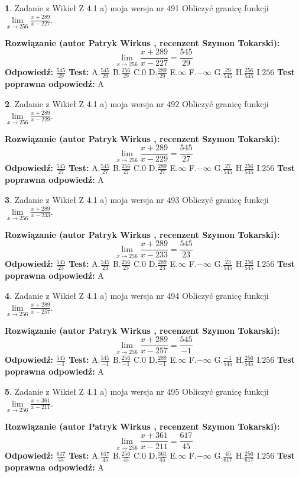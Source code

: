 \documentclass[12pt, a4paper]{article}
\theoremstyle{definition} %
\newtheorem{zad}{}
\newcommand{\zadStart}[1]{\begin{zad}#1\newline}
\newcommand{\zadStop}{\end{zad}}
\newcommand{\rozwStart}[2]{\noindent \textbf{Rozwiązanie (autor #1 , recenzent #2): }\newline}
\newcommand{\rozwStop}{\newline}
\newcommand{\odpStart}{\noindent \textbf{Odpowiedź:}\newline}
\newcommand{\odpStop}{\newline}
\newcommand{\testStart}{\noindent \textbf{Test:}\newline}
\newcommand{\testStop}{\newline}
\newcommand{\kluczStart}{\noindent \textbf{Test poprawna odpowiedź:}\newline}
\newcommand{\kluczStop}{\newline}
\begin{document}
\zadStart{Zadanie z Wikieł Z 4.1 a) moja wersja nr 491}
Obliczyć granicę funkcji $\lim\limits_{x\to256}\frac{x+289}{x-227}$.
\zadStop
\rozwStart{Patryk Wirkus}{Szymon Tokarski}
$$\lim\limits_{x\to256}\frac{x+289}{x-227} = \frac{545}{29}$$
\rozwStop
\odpStart
$\frac{545}{29}$
\odpStop
\testStart
A.$\frac{545}{29}$
B.$\frac{256}{29}$
C.$0$
D.$\frac{289}{29}$
E.$\infty$
F.$-\infty$
G.$\frac{29}{545}$
H.$\frac{256}{545}$
I.$256$
\testStop
\kluczStart
A
\kluczStop



\zadStart{Zadanie z Wikieł Z 4.1 a) moja wersja nr 492}
Obliczyć granicę funkcji $\lim\limits_{x\to256}\frac{x+289}{x-229}$.
\zadStop
\rozwStart{Patryk Wirkus}{Szymon Tokarski}
$$\lim\limits_{x\to256}\frac{x+289}{x-229} = \frac{545}{27}$$
\rozwStop
\odpStart
$\frac{545}{27}$
\odpStop
\testStart
A.$\frac{545}{27}$
B.$\frac{256}{27}$
C.$0$
D.$\frac{289}{27}$
E.$\infty$
F.$-\infty$
G.$\frac{27}{545}$
H.$\frac{256}{545}$
I.$256$
\testStop
\kluczStart
A
\kluczStop



\zadStart{Zadanie z Wikieł Z 4.1 a) moja wersja nr 493}
Obliczyć granicę funkcji $\lim\limits_{x\to256}\frac{x+289}{x-233}$.
\zadStop
\rozwStart{Patryk Wirkus}{Szymon Tokarski}
$$\lim\limits_{x\to256}\frac{x+289}{x-233} = \frac{545}{23}$$
\rozwStop
\odpStart
$\frac{545}{23}$
\odpStop
\testStart
A.$\frac{545}{23}$
B.$\frac{256}{23}$
C.$0$
D.$\frac{289}{23}$
E.$\infty$
F.$-\infty$
G.$\frac{23}{545}$
H.$\frac{256}{545}$
I.$256$
\testStop
\kluczStart
A
\kluczStop



\zadStart{Zadanie z Wikieł Z 4.1 a) moja wersja nr 494}
Obliczyć granicę funkcji $\lim\limits_{x\to256}\frac{x+289}{x-257}$.
\zadStop
\rozwStart{Patryk Wirkus}{Szymon Tokarski}
$$\lim\limits_{x\to256}\frac{x+289}{x-257} = \frac{545}{-1}$$
\rozwStop
\odpStart
$\frac{545}{-1}$
\odpStop
\testStart
A.$\frac{545}{-1}$
B.$\frac{256}{-1}$
C.$0$
D.$\frac{289}{-1}$
E.$\infty$
F.$-\infty$
G.$\frac{-1}{545}$
H.$\frac{256}{545}$
I.$256$
\testStop
\kluczStart
A
\kluczStop



\zadStart{Zadanie z Wikieł Z 4.1 a) moja wersja nr 495}
Obliczyć granicę funkcji $\lim\limits_{x\to256}\frac{x+361}{x-211}$.
\zadStop
\rozwStart{Patryk Wirkus}{Szymon Tokarski}
$$\lim\limits_{x\to256}\frac{x+361}{x-211} = \frac{617}{45}$$
\rozwStop
\odpStart
$\frac{617}{45}$
\odpStop
\testStart
A.$\frac{617}{45}$
B.$\frac{256}{45}$
C.$0$
D.$\frac{361}{45}$
E.$\infty$
F.$-\infty$
G.$\frac{45}{617}$
H.$\frac{256}{617}$
I.$256$
\testStop
\kluczStart
A
\kluczStop
\end{document}
